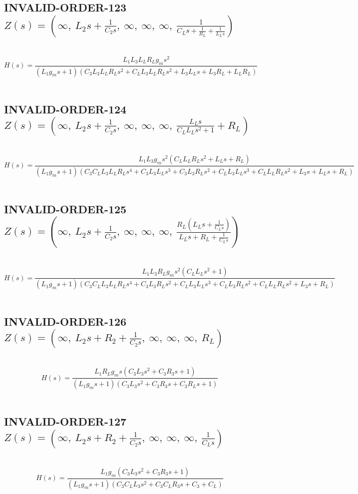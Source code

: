 \documentclass{article}
\begin{document}
\subsection{INVALID-ORDER-123 $Z(s) = \left( \infty, \  L_{2} s + \frac{1}{C_{2} s}, \  \infty, \  \infty, \  \infty, \  \frac{1}{C_{L} s + \frac{1}{R_{L}} + \frac{1}{L_{L} s}}\right)$ } \ 
\textbf{\[H(s) = \frac{L_{1} L_{3} L_{L} R_{L} g_{m} s^{2}}{\left(L_{1} g_{m} s + 1\right) \left(C_{3} L_{3} L_{L} R_{L} s^{2} + C_{L} L_{3} L_{L} R_{L} s^{2} + L_{3} L_{L} s + L_{3} R_{L} + L_{L} R_{L}\right)}\] } \ 
\subsection{INVALID-ORDER-124 $Z(s) = \left( \infty, \  L_{2} s + \frac{1}{C_{2} s}, \  \infty, \  \infty, \  \infty, \  \frac{L_{L} s}{C_{L} L_{L} s^{2} + 1} + R_{L}\right)$ } \ 
\textbf{\[H(s) = \frac{L_{1} L_{3} g_{m} s^{2} \left(C_{L} L_{L} R_{L} s^{2} + L_{L} s + R_{L}\right)}{\left(L_{1} g_{m} s + 1\right) \left(C_{3} C_{L} L_{3} L_{L} R_{L} s^{4} + C_{3} L_{3} L_{L} s^{3} + C_{3} L_{3} R_{L} s^{2} + C_{L} L_{3} L_{L} s^{3} + C_{L} L_{L} R_{L} s^{2} + L_{3} s + L_{L} s + R_{L}\right)}\] } \ 
\subsection{INVALID-ORDER-125 $Z(s) = \left( \infty, \  L_{2} s + \frac{1}{C_{2} s}, \  \infty, \  \infty, \  \infty, \  \frac{R_{L} \left(L_{L} s + \frac{1}{C_{L} s}\right)}{L_{L} s + R_{L} + \frac{1}{C_{L} s}}\right)$ } \ 
\textbf{\[H(s) = \frac{L_{1} L_{3} R_{L} g_{m} s^{2} \left(C_{L} L_{L} s^{2} + 1\right)}{\left(L_{1} g_{m} s + 1\right) \left(C_{3} C_{L} L_{3} L_{L} R_{L} s^{4} + C_{3} L_{3} R_{L} s^{2} + C_{L} L_{3} L_{L} s^{3} + C_{L} L_{3} R_{L} s^{2} + C_{L} L_{L} R_{L} s^{2} + L_{3} s + R_{L}\right)}\] } \ 
\subsection{INVALID-ORDER-126 $Z(s) = \left( \infty, \  L_{2} s + R_{2} + \frac{1}{C_{2} s}, \  \infty, \  \infty, \  \infty, \  R_{L}\right)$ } \ 
\textbf{\[H(s) = \frac{L_{1} R_{L} g_{m} s \left(C_{3} L_{3} s^{2} + C_{3} R_{3} s + 1\right)}{\left(L_{1} g_{m} s + 1\right) \left(C_{3} L_{3} s^{2} + C_{3} R_{3} s + C_{3} R_{L} s + 1\right)}\] } \ 
\subsection{INVALID-ORDER-127 $Z(s) = \left( \infty, \  L_{2} s + R_{2} + \frac{1}{C_{2} s}, \  \infty, \  \infty, \  \infty, \  \frac{1}{C_{L} s}\right)$ } \ 
\textbf{\[H(s) = \frac{L_{1} g_{m} \left(C_{3} L_{3} s^{2} + C_{3} R_{3} s + 1\right)}{\left(L_{1} g_{m} s + 1\right) \left(C_{3} C_{L} L_{3} s^{2} + C_{3} C_{L} R_{3} s + C_{3} + C_{L}\right)}\] } \ 
\end{document}
